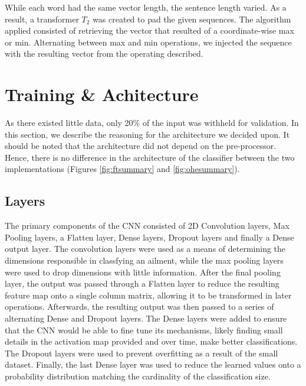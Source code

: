 \documentclass[12pt]{report}
\begin{document}
While each word had the same vector length, the sentence length varied. As a result,
a transformer $T_2$ was created to pad the given sequences. The algorithm
applied consisted of retrieving the vector that resulted of a coordinate-wise
max or min. Alternating between max and min operations, we injected the sequence
with the resulting vector from the operating described\cite{2016}.

\section{Training \& Achitecture}
As there existed little data, only 20\% of the input was withheld for validation.
In this section, we describe the reasoning for the architecture we decided upon.
It should be noted that the architecture did not depend on the pre-processor.
Hence, there is no difference in the architecture of the classifier between the two implementations 
(Figures \ref{fig:ftsummary} and \ref{fig:ohesummary}).

\subsection{Layers}
The primary components of the CNN consisted of 2D Convolution layers,
Max Pooling layers, a Flatten layer, Dense layers, Dropout layers and finally a Dense output layer.
The convolution layers were used as a means of determining the dimensions
responsible in classfying an ailment, while the max pooling layers were used to drop
dimensions with little information. After the final pooling layer, the output was passed through a
Flatten layer to reduce the resulting feature map onto a single column matrix, allowing it to be
transformed in later operations.
Afterwards, the resulting output was then passed to a series of alternating
Dense and Dropout layers. The Dense layers were added to ensure
that the CNN would be able to fine tune its mechanisms, likely finding small details in the activation map provided
and over time, make better classifications. The Dropout layers were used to prevent overfitting
as a result of the small dataset. Finally, the last Dense layer was used to reduce
the learned values onto a probability distribution matching the cardinality of the classification size\cite{chollet2015keras}.
\end{document}
